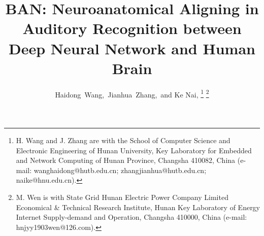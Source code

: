 \documentclass[journal]{IEEEtran}
\begin{document}
%
\title{BAN: Neuroanatomical Aligning in Auditory Recognition between Deep Neural Network and Human Brain}
%
%
%


\author{Haidong~Wang,~Jianhua~Zhang,~and Ke Nai,%
	\thanks{H. Wang and J. Zhang are with the School of Computer Science and Electronic Engineering of Hunan University, Key Laboratory for Embedded and Network Computing of Hunan Province, Changsha 410082, China (e-mail: wanghaidong@hutb.edu.cn; zhangjianhua@hutb.edu.cn;
		naike@hnu.edu.cn).}
	\thanks{M. Wen is with State Grid Hunan Electric Power Company Limited Economical \& Technical Research Institute, Hunan Key Laboratory of Energy Internet Supply-demand and Operation, Changsha 410000, China (e-mail: hnjyy1903wen@126.com).}
}


% 
%
\end{document}
